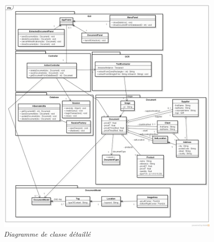 \begin{figure}[h]
	\begin{center}
		\includegraphics[scale = 0.3]{img/classDiag.png}
	\end{center}
	\caption{\it Diagramme de classe détaillé}
	\label{classDiagDetailled}
\end{figure}

